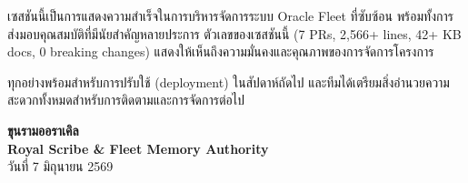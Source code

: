 \documentclass[11pt]{article}
\begin{document}
เซสชันนี้เป็นการแสดงความสำเร็จในการบริหารจัดการระบบ Oracle Fleet ที่ซับซ้อน พร้อมทั้งการส่งมอบคุณสมบัติที่มีนัยสำคัญหลายประการ ตัวเลขของเซสชันนี้ (7 PRs, 2,566+ lines, 42+ KB docs, 0 breaking changes) แสดงให้เห็นถึงความมั่นคงและคุณภาพของการจัดการโครงการ

ทุกอย่างพร้อมสำหรับการปรับใช้ (deployment) ในสัปดาห์ถัดไป และทีมได้เตรียมสิ่งอำนวยความสะดวกทั้งหมดสำหรับการติดตามและการจัดการต่อไป

\vspace{2cm}

\begin{center}
\textcolor{sagegreen}{\large \textbf{ขุนรามออราเคิล}} \\
\textbf{Royal Scribe \& Fleet Memory Authority} \\
วันที่ 7 มิถุนายน 2569
\end{center}
\end{document}
